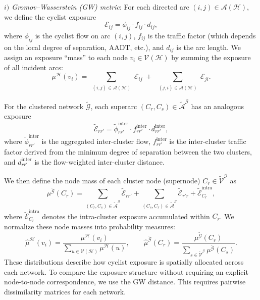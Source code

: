 \documentclass[lettersize,journal]{IEEEtran}
\begin{document}
\textit{$i)$ Gromov--Wasserstein (GW) metric}: For each directed arc $(i,j) \in \mathcal{A}(\mathcal{H})$, we define the cyclist exposure
\begin{equation}
    \mathcal{E}_{ij}
    =
    \phi_{ij}
    \cdot
    f_{ij}
    \cdot
    d_{ij},
\end{equation}
where $\phi_{ij}$ is the cyclist flow on arc $(i,j)$,
$f_{ij}$ is the traffic factor (which depends on the local degree of separation, AADT, etc.),
and $d_{ij}$ is the arc length. We assign an exposure ``mass'' to each node $v_i \in \mathcal{V}(\mathcal{H})$ by summing
the exposure of all incident arcs:
\begin{equation}
    \mu^{\mathcal{H}}(v_i)
    =
    \sum_{\substack{(i,j)\in \mathcal{A}(\mathcal{H})}}
    \mathcal{E}_{ij}
    \;+\;
    \sum_{\substack{(j,i)\in \mathcal{A}(\mathcal{H})}}
    \mathcal{E}_{ji}.
\end{equation}

For the clustered network $\tilde{\mathcal{G}}$, each superarc $(C_r, C_s) \in \tilde{\mathcal{A}}^{\mathcal{G}}$
has an analogous exposure
\begin{equation}
    \tilde{\mathcal{E}}_{rr'}
    =
    \tilde{\phi}^{\text{inter}}_{rr'}
    \cdot
    f^{\text{inter}}_{rr'}
    \cdot
    d^{\text{inter}}_{rr'},
\end{equation}
where $\tilde{\phi}^{\text{inter}}_{rr'}$ is the aggregated inter-cluster flow,
$f^{\text{inter}}_{rr'}$ is the inter-cluster traffic factor derived from the minimum
degree of separation between the two clusters, and
$d^{\text{inter}}_{rr'}$ is the flow-weighted inter-cluster distance.

We then define the node mass of each cluster node (supernode)
$C_r \in \tilde{\mathcal{V}}^{\mathcal{G}}$ as
\begin{equation}
    \mu^{\tilde{\mathcal{G}}}(C_r)
    =
    \sum_{(C_r,C_s)\in \tilde{\mathcal{A}}^{\mathcal{G}}} \tilde{\mathcal{E}}_{rr'}
    +
    \sum_{(C_s,C_r)\in \tilde{\mathcal{A}}^{\mathcal{G}}} \tilde{\mathcal{E}}_{r'r}
    +
    \tilde{\mathcal{E}}^{\text{intra}}_{C_r},
\end{equation}
where $\tilde{\mathcal{E}}^{\text{intra}}_{C_r}$ denotes the intra-cluster exposure
accumulated within $C_r$. We normalize these node masses into probability measures:
\begin{equation}
    \hat{\mu}^{\mathcal{H}}(v_i)
    =
    \frac{\mu^{\mathcal{H}}(v_i)}
    {\sum_{u \in \mathcal{V}(\mathcal{H})} \mu^{\mathcal{H}}(u)},
    \qquad
    \hat{\mu}^{\tilde{\mathcal{G}}}(C_r)
    =
    \frac{\mu^{\tilde{\mathcal{G}}}(C_r)}
    {\sum_{s \in \tilde{\mathcal{V}}^{\mathcal{G}}} \mu^{\tilde{\mathcal{G}}}(C_s)}.
\end{equation}
These distributions describe how cyclist exposure is spatially allocated across each network. To compare the exposure structure without requiring an explicit node-to-node correspondence, we use the GW distance. This requires pairwise dissimilarity
matrices for each network.
\end{document}
